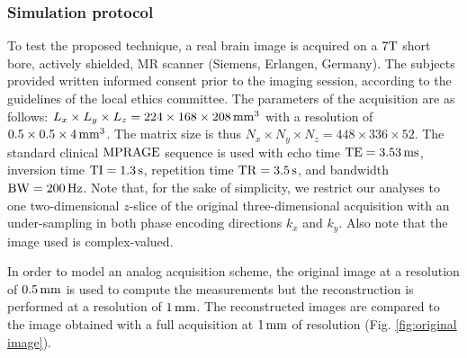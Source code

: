 \documentclass[10pt,draftcls, onecolumn]{IEEEtran}
\begin{document}
\subsubsection{Simulation protocol}

To test the proposed technique, a real brain image is acquired on a $7\rm{T}$ short bore, actively shielded, MR scanner (Siemens, Erlangen, Germany). The subjects provided written informed consent prior to the imaging session, according to the guidelines of the local ethics committee. The parameters of the acquisition are as follows: $L_x \times  L_y \times L_z = 224 \times 168 \times 208 \, {\rm mm}^3$ with a resolution of $0.5 \times 0.5 \times 4 \, {\rm mm}^3$. The matrix size is thus $N_x \times  N_y \times N_z = 448 \times 336 \times 52$. The standard clinical ${\rm MPRAGE}$ sequence is used with echo time $\rm{TE} = 3.53\,\rm{ms}$, inversion time $\rm{TI} = 1.3 \,\rm{s}$, repetition time $\rm{TR} = 3.5\,\rm{s}$, and bandwidth $\rm{BW} = 200\,\rm{Hz}$. Note that, for the sake of simplicity, we restrict our analyses to one two-dimensional $z$-slice of the original three-dimensional acquisition with an under-sampling in both phase encoding directions $k_x$ and $k_y$. Also note that the image used is complex-valued.

In order to model an analog acquisition scheme, the original image at a resolution of $0.5 \, \rm{mm}$ is used to compute the measurements but the reconstruction is performed at a resolution of $1 \, \rm{mm}$. The reconstructed images are compared to the image obtained with a full acquisition at $1 \, \rm{mm}$ of resolution (Fig. \ref{fig:original image}).
\end{document}
